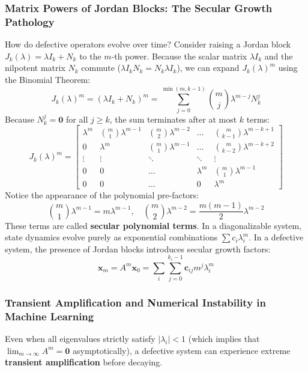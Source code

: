 \subsubsection{Matrix Powers of Jordan Blocks: The Secular Growth Pathology}
How do defective operators evolve over time? Consider raising a Jordan block $J_k(\lambda) = \lambda I_k + N_k$ to the $m$-th power. Because the scalar matrix $\lambda I_k$ and the nilpotent matrix $N_k$ commute ($\lambda I_k N_k = N_k \lambda I_k$), we can expand $J_k(\lambda)^m$ using the Binomial Theorem:
\begin{equation}
J_k(\lambda)^m = (\lambda I_k + N_k)^m = \sum_{j=0}^{\min(m, k-1)} \binom{m}{j} \lambda^{m-j} N_k^j
\label{eq:jordan_powers}
\end{equation}
Because $N_k^j = \mathbf{0}$ for all $j \ge k$, the sum terminates after at most $k$ terms:
\begin{equation}
J_k(\lambda)^m = \begin{bmatrix}
\lambda^m & \binom{m}{1}\lambda^{m-1} & \binom{m}{2}\lambda^{m-2} & \dots & \binom{m}{k-1}\lambda^{m-k+1} \\
0 & \lambda^m & \binom{m}{1}\lambda^{m-1} & \dots & \binom{m}{k-2}\lambda^{m-k+2} \\
\vdots & \vdots & \ddots & \ddots & \vdots \\
0 & 0 & \dots & \lambda^m & \binom{m}{1}\lambda^{m-1} \\
0 & 0 & \dots & 0 & \lambda^m
\end{bmatrix}
\label{eq:jordan_power_matrix}
\end{equation}
Notice the appearance of the polynomial pre-factors:
\begin{equation}
\binom{m}{1}\lambda^{m-1} = m \lambda^{m-1}, \quad \binom{m}{2}\lambda^{m-2} = \frac{m(m-1)}{2}\lambda^{m-2}
\end{equation}
These terms are called \textbf{secular polynomial terms}. In a diagonalizable system, state dynamics evolve purely as exponential combinations $\sum c_i \lambda_i^m$. In a defective system, the presence of Jordan blocks introduces secular growth factors:
\begin{equation}
\mathbf{x}_m = A^m \mathbf{x}_0 = \sum_{i} \sum_{j=0}^{k_i-1} \mathbf{c}_{ij} m^j \lambda_i^m
\end{equation}

\subsubsection{Transient Amplification and Numerical Instability in Machine Learning}
Even when all eigenvalues strictly satisfy $|\lambda_i| < 1$ (which implies that $\lim_{m \to \infty} A^m = \mathbf{0}$ asymptotically), a defective system can experience extreme \textbf{transient amplification} before decaying.


